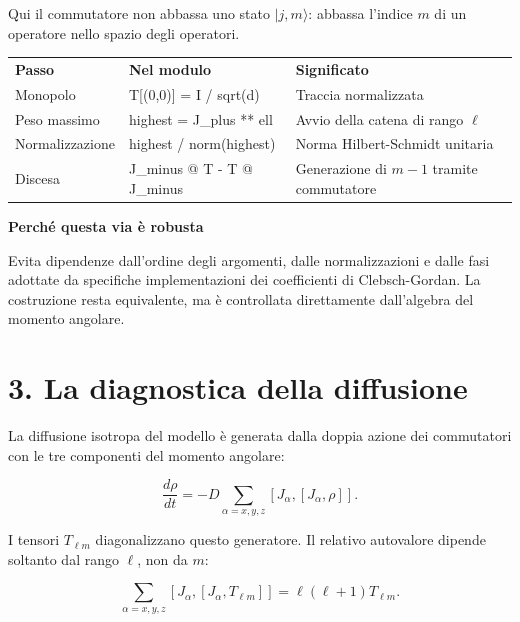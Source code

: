 \documentclass[10pt,a4paper]{article}
\newcommand{\cardtitle}[1]{{\sffamily\bfseries\color{Navy}#1\par}\smallskip}
\begin{document}
Qui il commutatore non abbassa uno stato $\lvert j,m\rangle$: abbassa l'indice
$m$ di un operatore nello spazio degli operatori.

\begin{tabularx}{\textwidth}{p{30mm}>{\ttfamily\small}p{59mm}Y}
  \color{white}\bfseries\sffamily Passo &
  \color{white}\bfseries\sffamily Nel modulo &
  \color{white}\bfseries\sffamily Significato \\
  Monopolo & T[(0,0)] = I / sqrt(d) & Traccia normalizzata \\
  Peso massimo & highest = J\_plus ** ell & Avvio della catena di rango $\ell$ \\
  Normalizzazione & highest / norm(highest) & Norma Hilbert-Schmidt unitaria \\
  Discesa & J\_minus @ T - T @ J\_minus & Generazione di $m-1$ tramite commutatore \\
\end{tabularx}

\begin{notebox}
  \cardtitle{Perch\'e questa via \`e robusta}
  Evita dipendenze dall'ordine degli argomenti, dalle normalizzazioni e dalle
  fasi adottate da specifiche implementazioni dei coefficienti di
  Clebsch-Gordan. La costruzione resta equivalente, ma \`e controllata
  direttamente dall'algebra del momento angolare.
\end{notebox}

\newpage

\section*{3. La diagnostica della diffusione}

La diffusione isotropa del modello \`e generata dalla doppia azione dei
commutatori con le tre componenti del momento angolare:

\begin{equationbox}
\[
  \frac{d\rho}{dt}
  =-D\sum_{\alpha=x,y,z}
  [J_{\alpha},[J_{\alpha},\rho]].
\]
\end{equationbox}

I tensori $T_{\ell m}$ diagonalizzano questo generatore. Il relativo autovalore
dipende soltanto dal rango $\ell$, non da $m$:

\begin{equationbox}
\[
  \sum_{\alpha=x,y,z}
  [J_{\alpha},[J_{\alpha},T_{\ell m}]]
  =\ell(\ell+1)T_{\ell m}.
\]
\end{equationbox}
\end{document}
